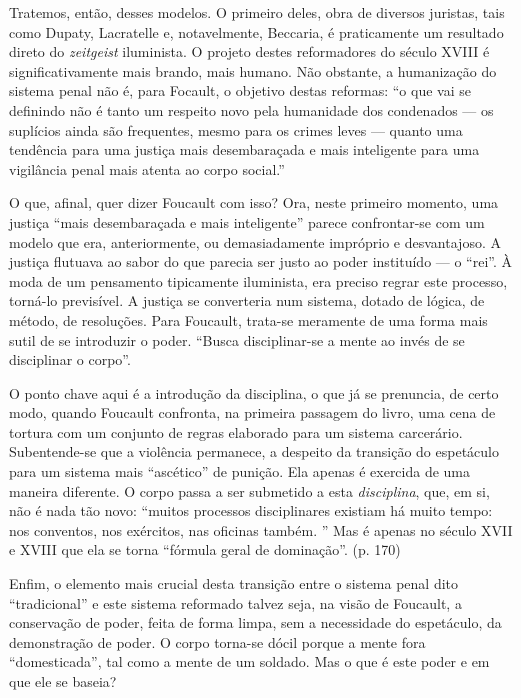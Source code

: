 \documentclass[12pt,a4paper]{article}
\begin{document}
	Tratemos, então, desses modelos. O primeiro deles, obra de diversos 
	juristas, tais como Dupaty, Lacratelle e, notavelmente, Beccaria, 
	é praticamente um resultado direto do \textit{zeitgeist} iluminista. 
	O projeto destes reformadores do século XVIII é significativamente 
	mais brando, mais humano. Não obstante, a humanização do sistema 
	penal não é, para Focault, o objetivo destas reformas:  
	``o que vai se definindo não é tanto um respeito novo pela humanidade 
	dos condenados --- os suplícios ainda são frequentes, mesmo para os 
	crimes leves --- quanto uma tendência para uma justiça mais 
	desembaraçada e mais inteligente para uma vigilância penal mais atenta 
	ao corpo social.'' 

	O que, afinal, quer dizer Foucault com isso? Ora, neste primeiro 
	momento, uma justiça ``mais desembaraçada e mais inteligente'' parece 
	confrontar-se com um modelo que era, anteriormente, ou demasiadamente 
	impróprio e desvantajoso. A justiça flutuava ao sabor do que parecia ser 
	justo ao poder instituído --- o ``rei''. À moda de um pensamento 
	tipicamente iluminista, era preciso regrar este processo, torná-lo 
	previsível. A justiça se converteria num sistema, dotado de lógica, de 
	método, de resoluções. Para Foucault, trata-se meramente de uma forma 
	mais sutil de se introduzir o poder. ``Busca disciplinar-se a mente ao 
	invés de se disciplinar o corpo''. 

	O ponto chave aqui é a introdução da disciplina, o que já 
	se prenuncia, de certo modo, quando Foucault confronta, na primeira 
	passagem do livro, uma cena de tortura com um conjunto de regras 
	elaborado para um sistema carcerário. Subentende-se que a violência 
	permanece, a despeito da transição do espetáculo para um sistema 
	mais ``ascético'' de punição. Ela apenas é exercida de uma maneira 
	diferente. O corpo passa a ser submetido a esta \textit{disciplina}, 
	que, em si, não é nada tão novo: ``muitos processos disciplinares 
	existiam há muito tempo: nos conventos, nos exércitos, nas oficinas 
	também. '' Mas é apenas no século XVII e XVIII que ela se torna 
	``fórmula geral de dominação''. \cite{foucault} (p. 170)

	Enfim, o elemento mais crucial desta transição entre o sistema penal 
	dito ``tradicional'' e este sistema reformado talvez seja, na visão 
	de Foucault, a conservação de poder, feita de forma limpa, sem a 
	necessidade do espetáculo, da demonstração de poder. O corpo torna-se 
	dócil porque a mente fora ``domesticada'', tal como a mente de um 
	soldado. Mas o que é este poder e em que ele se baseia? 
\end{document}

